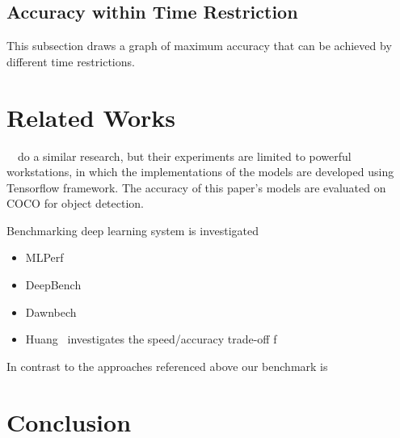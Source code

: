 \documentclass[conference]{IEEEtran}
\begin{document}
\subsection{Accuracy within Time Restriction}
This subsection draws a graph of maximum accuracy that can be achieved by different time restrictions. 

\section{Related Works}
~\cite{huang2017speed}~do a similar research, but their experiments are limited to powerful workstations, in which the implementations of the models are developed using Tensorflow framework. The accuracy of this paper's models are evaluated on COCO for object detection.

Benchmarking deep learning system is investigated

\begin{itemize}
    \item MLPerf
    \item DeepBench
    \item Dawnbech
    \item Huang~\cite{DBLP:journals/corr/HuangRSZKFFWSG016} investigates the speed/accuracy trade-off f
\end{itemize}

In contrast to the approaches referenced above our benchmark is 


\section{Conclusion}



%





\end{document}
